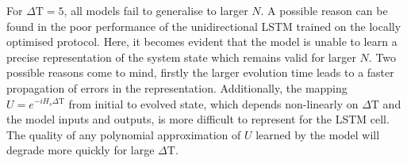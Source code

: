 For $\Delta \mathrm{T} = 5$, all models fail to generalise to larger $N$.
A possible reason can be found in the poor performance of the unidirectional LSTM trained on the locally optimised protocol.
Here, it becomes evident that the model is unable to learn a precise representation of the system state which remains valid for larger $N$.
Two possible reasons come to mind, firstly the larger evolution time leads to a faster propagation of errors in the representation.
Additionally, the mapping $U = e^{-i H_s \Delta \mathrm{T}}$ from initial to evolved state, which depends non-linearly on $\Delta \mathrm{T}$ and the model inputs and outputs, is more difficult to represent for the LSTM cell.
The quality of any polynomial approximation of $U$ learned by the model will degrade more quickly for large $\Delta \mathrm{T}$.